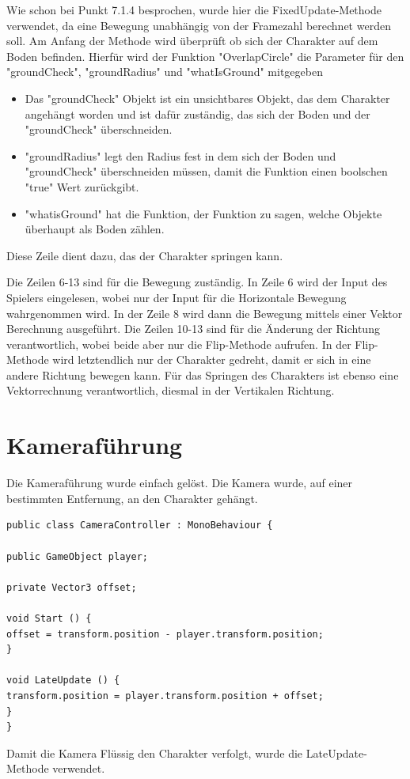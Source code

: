 Wie schon bei Punkt 7.1.4 besprochen, wurde hier die FixedUpdate-Methode verwendet, da eine Bewegung unabhängig von der Framezahl berechnet werden soll. Am Anfang der Methode wird überprüft ob sich der Charakter auf dem Boden befinden. Hierfür wird der Funktion "OverlapCircle" die Parameter für den "groundCheck", "groundRadius" und "whatIsGround" mitgegeben
\begin{itemize}
	\item Das "groundCheck" Objekt ist ein unsichtbares Objekt, das dem Charakter angehängt worden und ist dafür zuständig, das sich der Boden und der "groundCheck" überschneiden.
	\item "groundRadius" legt den Radius fest in dem sich der Boden und "groundCheck" überschneiden müssen, damit die Funktion einen boolschen "true" Wert zurückgibt.
	\item "whatisGround" hat die Funktion, der Funktion zu sagen, welche Objekte überhaupt als Boden zählen.
\end{itemize}
Diese Zeile dient dazu, das der Charakter springen kann.

Die Zeilen 6-13  sind für die Bewegung zuständig. In Zeile 6 wird der Input des Spielers eingelesen, wobei nur der Input für die Horizontale Bewegung wahrgenommen wird.
In der Zeile 8 wird dann die Bewegung mittels einer Vektor Berechnung ausgeführt.
Die Zeilen 10-13 sind für die Änderung der Richtung verantwortlich, wobei beide aber nur die Flip-Methode aufrufen. In der Flip-Methode wird letztendlich nur der Charakter gedreht, damit er sich in eine andere Richtung bewegen kann.
Für das Springen des Charakters ist ebenso eine Vektorrechnung verantwortlich, diesmal in der Vertikalen Richtung.

\section{Kameraführung}
Die Kameraführung wurde einfach gelöst. Die Kamera wurde, auf einer bestimmten Entfernung, an den Charakter gehängt. 

\begin{lstlisting}[language={[Sharp]C}]
public class CameraController : MonoBehaviour {

public GameObject player;

private Vector3 offset;

void Start () {
offset = transform.position - player.transform.position;
}

void LateUpdate () {
transform.position = player.transform.position + offset;
}
}
\end{lstlisting}
Damit die Kamera Flüssig den Charakter verfolgt, wurde die LateUpdate-Methode verwendet.

